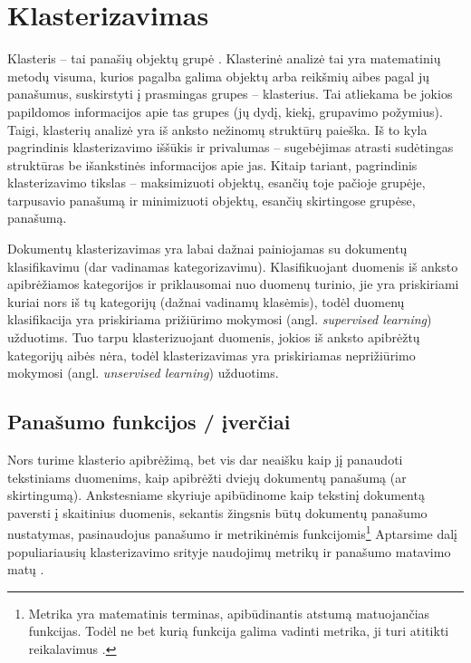 \documentclass{VUMIFInfKursinis}
\newcommand{\ltang}[2]{#1 (angl. \textit{#2})}
\begin{document}
\section{Klasterizavimas}

Klasteris – tai panašių objektų grupė \cite{tan2007introduction}.
Klasterinė analizė tai yra matematinių metodų visuma, kurios pagalba
galima objektų arba reikšmių aibes pagal jų panašumus, suskirstyti į
prasmingas grupes – klasterius. Tai atliekama be jokios papildomos
informacijos apie tas grupes (jų dydį, kiekį, grupavimo požymius).
Taigi, klasterių analizė yra iš anksto nežinomų struktūrų paieška. Iš to
kyla pagrindinis klasterizavimo iššūkis ir privalumas – sugebėjimas
atrasti sudėtingas struktūras be išankstinės informacijos apie jas.
Kitaip tariant, pagrindinis klasterizavimo tikslas – maksimizuoti
objektų, esančių toje pačioje grupėje, tarpusavio panašumą ir
minimizuoti objektų, esančių skirtingose grupėse, panašumą.

Dokumentų klasterizavimas yra labai dažnai painiojamas su dokumentų
klasifikavimu (dar vadinamas kategorizavimu). Klasifikuojant duomenis iš
anksto apibrėžiamos kategorijos ir priklausomai nuo duomenų turinio, jie
yra priskiriami kuriai nors iš tų kategorijų (dažnai vadinamų klasėmis),
todėl duomenų klasifikacija yra priskiriama \ltang{prižiūrimo mokymosi}{supervised learning} užduotims. 
Tuo tarpu klasterizuojant
duomenis, jokios iš anksto apibrėžtų kategorijų aibės nėra, todėl
klasterizavimas yra priskiriamas \ltang{neprižiūrimo mokymosi}{unservised learning} užduotims.






\subsection{Panašumo funkcijos / įverčiai}

Nors turime klasterio apibrėžimą, bet vis dar neaišku kaip jį panaudoti
tekstiniams duomenims, kaip apibrėžti dviejų dokumentų panašumą (ar
skirtingumą). Ankstesniame skyriuje apibūdinome kaip tekstinį dokumentą
paversti į skaitinius duomenis, sekantis žingsnis būtų dokumentų
panašumo nustatymas, pasinaudojus panašumo ir metrikinėmis
funkcijomis\footnote{Metrika yra matematinis terminas, apibūdinantis
  atstumą matuojančias funkcijas. Todėl ne bet kurią funkcija galima
  vadinti metrika, ji turi atitikti reikalavimus \cite{daeoms}.}
Aptarsime dalį populiariausių klasterizavimo srityje naudojimų metrikų
ir panašumo matavimo matų \cite{huang2008similarity}.
\end{document}
